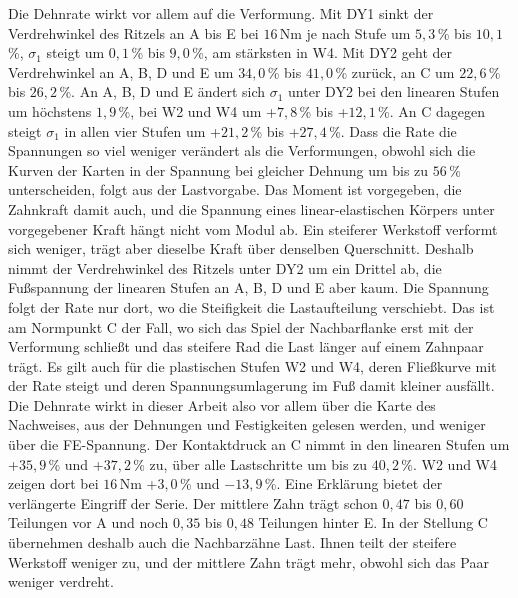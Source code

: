 			Die Dehnrate wirkt vor allem auf die Verformung. Mit DY1 sinkt der Verdrehwinkel des Ritzels an A bis E bei $16$\,Nm je nach Stufe um $5{,}3$\,\% bis $10{,}1$\,\%, $\sigma_{\mathrm{1}}$ steigt um $0{,}1$\,\% bis $9{,}0$\,\%, am stärksten in W4. Mit DY2 geht der Verdrehwinkel an A, B, D und E um $34{,}0$\,\% bis $41{,}0$\,\% zurück, an C um $22{,}6$\,\% bis $26{,}2$\,\%. An A, B, D und E ändert sich $\sigma_{\mathrm{1}}$ unter DY2 bei den linearen Stufen um höchstens $1{,}9$\,\%, bei W2 und W4 um +$7{,}8$\,\% bis +$12{,}1$\,\%. An C dagegen steigt $\sigma_{\mathrm{1}}$ in allen vier Stufen um +$21{,}2$\,\% bis +$27{,}4$\,\%. Dass die Rate die Spannungen so viel weniger verändert als die Verformungen, obwohl sich die Kurven der Karten in der Spannung bei gleicher Dehnung um bis zu $56$\,\% unterscheiden, folgt aus der Lastvorgabe. Das Moment ist vorgegeben, die Zahnkraft damit auch, und die Spannung eines linear-elastischen Körpers unter vorgegebener Kraft hängt nicht vom Modul ab. Ein steiferer Werkstoff verformt sich weniger, trägt aber dieselbe Kraft über denselben Querschnitt. Deshalb nimmt der Verdrehwinkel des Ritzels unter DY2 um ein Drittel ab, die Fußspannung der linearen Stufen an A, B, D und E aber kaum. Die Spannung folgt der Rate nur dort, wo die Steifigkeit die Lastaufteilung verschiebt. Das ist am Normpunkt C der Fall, wo sich das Spiel der Nachbarflanke erst mit der Verformung schließt und das steifere Rad die Last länger auf einem Zahnpaar trägt. Es gilt auch für die plastischen Stufen W2 und W4, deren Fließkurve mit der Rate steigt und deren Spannungsumlagerung im Fuß damit kleiner ausfällt. Die Dehnrate wirkt in dieser Arbeit also vor allem über die Karte des Nachweises, aus der Dehnungen und Festigkeiten gelesen werden, und weniger über die FE-Spannung. Der Kontaktdruck an C nimmt in den linearen Stufen um +$35{,}9$\,\% und +$37{,}2$\,\% zu, über alle Lastschritte um bis zu $40{,}2$\,\%. W2 und W4 zeigen dort bei $16$\,Nm +$3{,}0$\,\% und $-$$13{,}9$\,\%. Eine Erklärung bietet der verlängerte Eingriff der Serie. Der mittlere Zahn trägt schon $0{,}47$ bis $0{,}60$ Teilungen vor A und noch $0{,}35$ bis $0{,}48$ Teilungen hinter E. In der Stellung C übernehmen deshalb auch die Nachbarzähne Last. Ihnen teilt der steifere Werkstoff weniger zu, und der mittlere Zahn trägt mehr, obwohl sich das Paar weniger verdreht.

